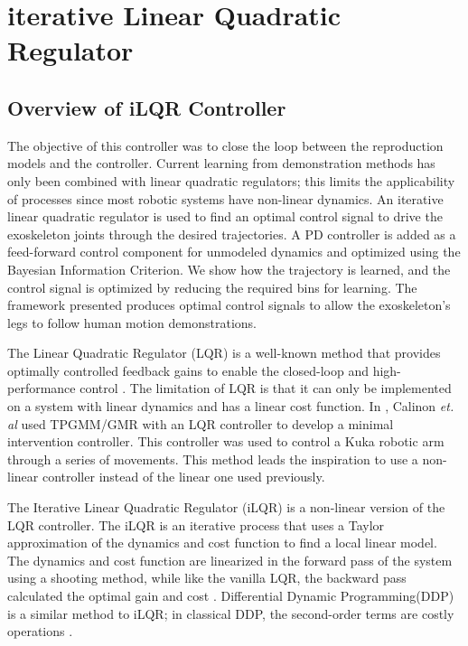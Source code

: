 \section{iterative Linear Quadratic Regulator}


\subsection{Overview of iLQR Controller}

The objective of this controller was to close the loop between the reproduction models and the controller. Current learning from demonstration methods has only been combined with linear quadratic regulators; this limits the applicability of processes since most robotic systems have non-linear dynamics. An iterative linear quadratic regulator is used to find an optimal control signal to drive the exoskeleton joints through the desired trajectories. A PD controller is added as a feed-forward control component for unmodeled dynamics and optimized using the Bayesian Information Criterion. We show how the trajectory is learned, and the control signal is optimized by reducing the required bins for learning. The framework presented produces optimal control signals to allow the exoskeleton's legs to follow human motion demonstrations.

The Linear Quadratic Regulator (LQR) is a well-known method that provides optimally controlled feedback gains to enable the closed-loop and high-performance control \cite{kirk2004optimal}. The limitation of LQR is that it can only be implemented on a system with linear dynamics and has a linear cost function. In \cite{TPGMM_calinon2016}, Calinon \textit{et. al} used TPGMM/GMR with an LQR controller to develop a minimal intervention controller. This controller was used to control a Kuka robotic arm \cite{schreiber2010fast} through a series of movements. This method leads the inspiration to use a non-linear controller instead of the linear one used previously.  

The Iterative Linear Quadratic Regulator (iLQR) is a non-linear version of the LQR controller. The iLQR is an iterative process that uses a Taylor approximation of the dynamics and cost function to find a local linear model. The dynamics and cost function are linearized in the forward pass of the system using a shooting method, while like the vanilla LQR, the backward pass calculated the optimal gain and cost \cite{iLQR_paper}. Differential Dynamic Programming(DDP) is a similar method to iLQR; in classical DDP, the second-order terms are costly operations \cite{iLQR_tassa2014}  \cite{iLQR_Zachary2016}.

